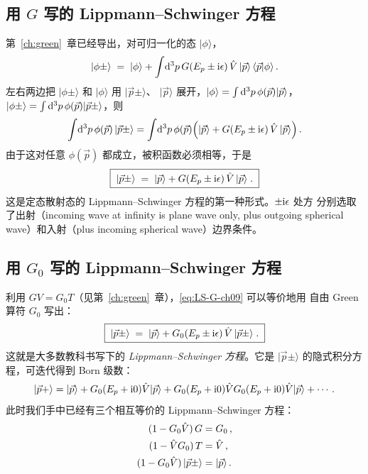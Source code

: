 \subsection{用 $G$ 写的 Lippmann--Schwinger 方程}

第~\ref{ch:green}~章已经导出，对可归一化的态 $|\phi\rangle$，
\begin{equation}
  |\phi\pm\rangle \;=\; |\phi\rangle + \int\!\mathrm{d}^3 p\,
  G(E_p\pm \mathrm{i}\epsilon)\,\hat{V}\,|\vec p\rangle\,\langle \vec p|\phi\rangle\,.
  \label{eq:LS-phipm}
\end{equation}
左右两边把 $|\phi\pm\rangle$ 和 $|\phi\rangle$ 用 $|\vec p\pm\rangle$、
$|\vec p\rangle$ 展开，$|\phi\rangle = \int\mathrm{d}^3 p\,\phi(\vec p)|\vec p\rangle$，
$|\phi\pm\rangle = \int\mathrm{d}^3 p\,\phi(\vec p)|\vec p\pm\rangle$，则
\begin{equation}
  \int\!\mathrm{d}^3 p\,\phi(\vec p)\,|\vec p\pm\rangle
  = \int\!\mathrm{d}^3 p\,\phi(\vec p)\Big(|\vec p\rangle
    + G(E_p\pm \mathrm{i}\epsilon)\,\hat{V}\,|\vec p\rangle\Big)\,.
\end{equation}
由于这对任意 $\phi(\vec p)$ 都成立，被积函数必须相等，于是
\begin{equation}
  \boxed{\;|\vec p\pm\rangle \;=\; |\vec p\rangle
  + G(E_p\pm \mathrm{i}\epsilon)\,\hat{V}\,|\vec p\rangle\;.\;}
  \label{eq:LS-G-ch09}
\end{equation}
这是定态散射态的 Lippmann--Schwinger 方程的第一种形式。$\pm \mathrm{i}\epsilon$ 处方
分别选取了出射（incoming wave at infinity is plane wave only, plus outgoing
spherical wave）和入射（plus incoming spherical wave）边界条件。

\subsection{用 $G_0$ 写的 Lippmann--Schwinger 方程}

利用 $GV = G_0 T$（见第~\ref{ch:green}~章），\eqref{eq:LS-G-ch09} 可以等价地用
自由 Green 算符 $G_0$ 写出：
\begin{equation}
  \boxed{\;|\vec p\pm\rangle \;=\; |\vec p\rangle
  + G_0(E_p\pm \mathrm{i}\epsilon)\,\hat{V}\,|\vec p\pm\rangle\;.\;}
  \label{eq:LS-G0}
\end{equation}
这就是大多数教科书写下的 \emph{Lippmann--Schwinger 方程}。它是 $|\vec p\pm\rangle$
的隐式积分方程，可迭代得到 Born 级数：
\begin{equation}
  |\vec p+\rangle = |\vec p\rangle + G_0(E_p+\mathrm{i} 0)\hat{V}|\vec p\rangle
  + G_0(E_p+\mathrm{i} 0)\hat{V} G_0(E_p+\mathrm{i} 0)\hat{V}|\vec p\rangle + \cdots\,.
  \label{eq:Born-state}
\end{equation}
此时我们手中已经有三个相互等价的 Lippmann--Schwinger 方程：
\begin{align}
  (1-G_0\hat{V})\,G &= G_0\,,\label{eq:LS-G-ch09-op}\\
  (1-\hat{V} G_0)\,T &= \hat{V}\,,\label{eq:LS-T-ch09}\\
  (1-G_0\hat{V})\,|\vec p\pm\rangle &= |\vec p\rangle\,.\label{eq:LS-state-op}
\end{align}

